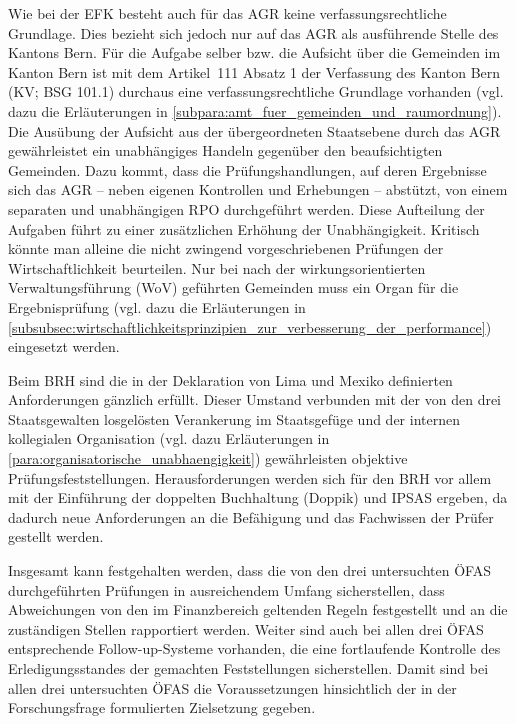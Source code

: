 \documentclass[10pt]{article}
\begin{document}
Wie bei der EFK besteht auch für das AGR keine verfassungsrechtliche Grundlage. Dies bezieht sich jedoch nur auf das AGR als ausführende Stelle des Kantons Bern. Für die Aufgabe selber bzw. die Aufsicht über die Gemeinden im Kanton Bern ist mit dem Artikel~111 Absatz 1 der Verfassung des Kanton Bern (KV; BSG 101.1) durchaus eine verfassungsrechtliche Grundlage vorhanden (vgl. dazu die Erläuterungen in \vref{subpara:amt_fuer_gemeinden_und_raumordnung}). Die Ausübung der Aufsicht aus der übergeordneten Staatsebene durch das AGR gewährleistet ein unabhängiges Handeln gegenüber den beaufsichtigten Gemeinden. Dazu kommt, dass die Prüfungshandlungen, auf deren Ergebnisse sich das AGR -- neben eigenen Kontrollen und Erhebungen -- abstützt, von einem separaten und unabhängigen RPO durchgeführt werden. Diese Aufteilung der Aufgaben führt zu einer zusätzlichen Erhöhung der Unabhängigkeit. Kritisch könnte man alleine die nicht zwingend vorgeschriebenen Prüfungen der Wirtschaftlichkeit beurteilen. Nur bei nach der wirkungsorientierten Verwaltungsführung (WoV) geführten Gemeinden muss ein Organ für die Ergebnisprüfung (vgl. dazu die Erläuterungen in \vref{subsubsec:wirtschaftlichkeitsprinzipien_zur_verbesserung_der_performance}) eingesetzt werden.

Beim BRH sind die in der Deklaration von Lima und Mexiko definierten Anforderungen gänzlich erfüllt. Dieser Umstand verbunden mit der von den drei Staatsgewalten losgelösten Verankerung im Staatsgefüge und der internen kollegialen Organisation (vgl. dazu Erläuterungen in \vref{para:organisatorische_unabhaengigkeit}) gewährleisten objektive Prüfungsfeststellungen. Herausforderungen werden sich für den BRH vor allem mit der Einführung der doppelten Buchhaltung (Doppik) und IPSAS ergeben, da dadurch neue Anforderungen an die Befähigung und das Fachwissen der Prüfer gestellt werden.

Insgesamt kann festgehalten werden, dass die von den drei untersuchten ÖFAS durchgeführten Prüfungen in ausreichendem Umfang sicherstellen, dass Abweichungen von den im Finanzbereich geltenden Regeln festgestellt und an die zuständigen Stellen rapportiert werden. Weiter sind auch bei allen drei ÖFAS entsprechende Follow-up-Systeme vorhanden, die eine fortlaufende Kontrolle des Erledigungsstandes der gemachten Feststellungen sicherstellen. Damit sind bei allen drei untersuchten ÖFAS die Voraussetzungen hinsichtlich der in der Forschungsfrage formulierten Zielsetzung gegeben.
\end{document}
